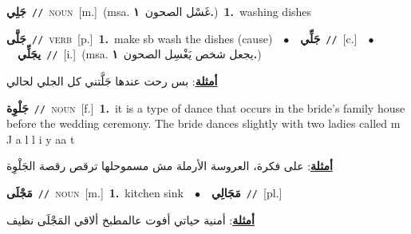 \documentclass[10pt,a4paper,twoside]{article} %
\begin{document}
\begin{multicols}{2}
{\setlength\topsep{0pt}\textbf{\foreignlanguage{arabic}{جَلِي}}\ {\color{gray}\texttt{//}\color{black}}\ \textsc{noun}\ [m.]\ \color{gray}(msa. \foreignlanguage{arabic}{غَسْل الصحون}~\foreignlanguage{arabic}{\textbf{١.}})\color{black}\ \textbf{1.}~washing dishes\ } \vspace{2mm}

{\setlength\topsep{0pt}\textbf{\foreignlanguage{arabic}{جَلَّى}}\ {\color{gray}\texttt{//}\color{black}}\ \textsc{verb}\ [p.]\ \textbf{1.}~make sb wash the dishes (cause)\ \ $\bullet$\ \ \setlength\topsep{0pt}\textbf{\foreignlanguage{arabic}{جَلِّي}}\ {\color{gray}\texttt{//}\color{black}}\ [c.]\ \ $\bullet$\ \ \setlength\topsep{0pt}\textbf{\foreignlanguage{arabic}{يجَلِّي}}\ {\color{gray}\texttt{//}\color{black}}\ [i.]\ \color{gray}(msa. \foreignlanguage{arabic}{يجعل شخص يَغْسِل الصحون}~\foreignlanguage{arabic}{\textbf{١.}})\color{black}\  \begin{flushright}\color{gray}\foreignlanguage{arabic}{\textbf{\underline{\foreignlanguage{arabic}{أمثلة}}}: بس رحت عندها جَلَّتني كل الجلي لحالي}\end{flushright}\color{black}} \vspace{2mm}

{\setlength\topsep{0pt}\textbf{\foreignlanguage{arabic}{جَلْوِة}}\ {\color{gray}\texttt{//}\color{black}}\ \textsc{noun}\ [f.]\ \textbf{1.}~it is a type of dance that occurs in the bride's family house before the wedding ceremony. The bride dances slightly with two ladies called m J a l l i y aa t\  \begin{flushright}\color{gray}\foreignlanguage{arabic}{\textbf{\underline{\foreignlanguage{arabic}{أمثلة}}}: على فكرة، العروسة الأرملة مش مسموحلها ترقص رقصة الجَلْوِة}\end{flushright}\color{black}} \vspace{2mm}

{\setlength\topsep{0pt}\textbf{\foreignlanguage{arabic}{مَجْلَى}}\ {\color{gray}\texttt{//}\color{black}}\ \textsc{noun}\ [m.]\ \textbf{1.}~kitchen sink\ \ $\bullet$\ \ \setlength\topsep{0pt}\textbf{\foreignlanguage{arabic}{مَجَالِي}}\ {\color{gray}\texttt{//}\color{black}}\ [pl.]\  \begin{flushright}\color{gray}\foreignlanguage{arabic}{\textbf{\underline{\foreignlanguage{arabic}{أمثلة}}}: أمنية حياتي أفوت عالمطبخ ألاقي المَجْلَى نظيف}\end{flushright}\color{black}} \vspace{2mm}


\end{multicols}
\end{document}
